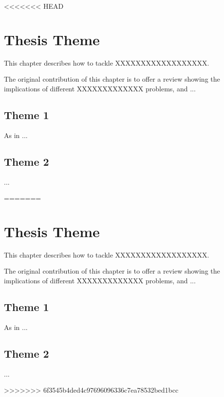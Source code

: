 <<<<<<< HEAD

\inbpdocument

\chapter{Thesis Theme}
\label{ch:corrIntro}


This chapter describes how to tackle XXXXXXXXXXXXXXXXXX.

The original contribution of this chapter is to offer a review showing the implications of different XXXXXXXXXXXXX problems, and ...

\section{Theme 1}
As  in \citep{article}...
\section{Theme 2}
...




\outbpdocument{}
=======

\inbpdocument

\chapter{Thesis Theme}
\label{ch:corrIntro}


This chapter describes how to tackle XXXXXXXXXXXXXXXXXX.

The original contribution of this chapter is to offer a review showing the implications of different XXXXXXXXXXXXX problems, and ...

\section{Theme 1}
As  in \citep{article}...
\section{Theme 2}
...




\outbpdocument{}
>>>>>>> 6f3545b4ded4c97696096336c7ea78532bed1bcc
